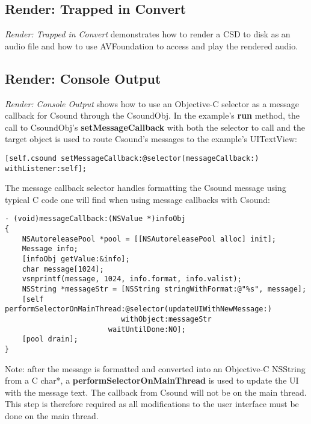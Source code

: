 \documentclass[11pt]{article}
\begin{document}
\subsection{Render: Trapped in Convert}

\emph{Render: Trapped in Convert} demonstrates how to render a CSD to disk as an audio file and how to use AVFoundation to access and play the rendered audio.   

\subsection{Render: Console Output}

\emph{Render: Console Output} shows how to use an Objective-C selector as a message callback for Csound through the CsoundObj.  In the example's \textbf{run} method, the call to CsoundObj's \textbf{setMessageCallback} with both the selector to call and the target object is used to route Csound's messages to the example's UITextView:

\begin{lstlisting}[caption=Example of setting message callback]
    [self.csound setMessageCallback:@selector(messageCallback:) withListener:self];
\end{lstlisting}

The message callback selector handles formatting the Csound message using typical C code one will find when using message callbacks with Csound:

\begin{lstlisting}[caption=Message Callback Selector Code]
- (void)messageCallback:(NSValue *)infoObj
{
    NSAutoreleasePool *pool = [[NSAutoreleasePool alloc] init];
    Message info;
    [infoObj getValue:&info];
    char message[1024];
    vsnprintf(message, 1024, info.format, info.valist);
    NSString *messageStr = [NSString stringWithFormat:@"%s", message];
    [self performSelectorOnMainThread:@selector(updateUIWithNewMessage:)
                           withObject:messageStr
                        waitUntilDone:NO];
    [pool drain];
}
\end{lstlisting}

Note: after the message is formatted and converted into an Objective-C NSString from a C char*, a \textbf{performSelectorOnMainThread} is used to update the UI with the message text.  The callback from Csound will not be on the main thread. This step is therefore required as all modifications to the user interface must be done on the main thread.
\end{document}
